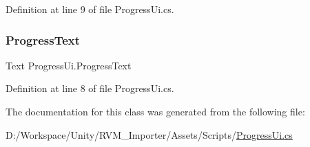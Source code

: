 Definition at line 9 of file Progress\+Ui.\+cs.

\mbox{\label{class_progress_ui_a510b0d8d5a1e7cf565beeca2b26d0463}} 
\subsubsection{\texorpdfstring{ProgressText}{ProgressText}}
{\footnotesize\ttfamily Text Progress\+Ui.\+Progress\+Text}



Definition at line 8 of file Progress\+Ui.\+cs.



The documentation for this class was generated from the following file\+:\begin{DoxyCompactItemize}
\item 
D\+:/\+Workspace/\+Unity/\+R\+V\+M\+\_\+\+Importer/\+Assets/\+Scripts/\mbox{\hyperlink{_progress_ui_8cs}{Progress\+Ui.\+cs}}\end{DoxyCompactItemize}

